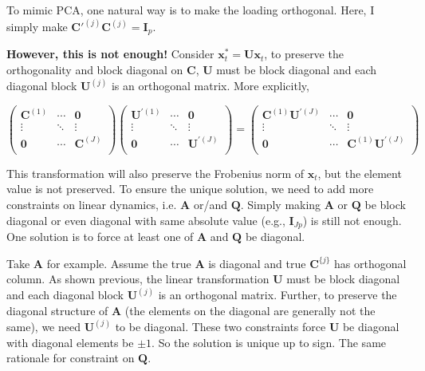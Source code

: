 \documentclass[]{article}
\begin{document}
To mimic PCA, one natural way is to make the loading orthogonal. Here, I simply make \(\mathbf{C}'^{(j)}\mathbf{C}^{(j)} = \mathbf{I}_{p}\).

\textbf{However, this is not enough!} Consider \(\mathbf{x}_{t}^{*} = \mathbf{Ux}_{t}\), to
preserve the orthogonality and block diagonal on \(\mathbf{C}\), \(\mathbf{U}\) must be
block diagonal and each diagonal block \(\mathbf{U}^{(j)}\) is an orthogonal matrix. More explicitly,

\[\begin{pmatrix}
	\mathbf{C}^{(1)} & \cdots & \mathbf{0} \\
	\vdots & \ddots & \vdots \\
	\mathbf{0} & \cdots & \mathbf{C}^{(J)} \\
\end{pmatrix}\begin{pmatrix}
	\mathbf{U}^{'(1)} & \cdots & \mathbf{0} \\
	\vdots & \ddots & \vdots \\
	\mathbf{0} & \cdots & \mathbf{U}^{'(J)} \\
\end{pmatrix} = \begin{pmatrix}
	\mathbf{C}^{(1)}\mathbf{U}^{'(J)} & \cdots & \mathbf{0} \\
	\vdots & \ddots & \vdots \\
	\mathbf{0} & \cdots & \mathbf{C}^{(1)}\mathbf{U}^{'(J)} \\
\end{pmatrix}\]

This transformation will also preserve the Frobenius norm of \(\mathbf{x}_{t}\),
but the element value is not preserved. To ensure the unique solution,
we need to add more constraints on linear dynamics, i.e. \(\mathbf{A}\) or/and
\(\mathbf{Q}\). Simply making \(\mathbf{A}\) or \(\mathbf{Q}\) be block diagonal or even diagonal
with same absolute value (e.g., \(\mathbf{I}_{Jp}\)) is still not enough. One solution is to force at least one of \(\mathbf{A}\) and \(\mathbf{Q}\) be diagonal.

Take \(\mathbf{A}\) for example. Assume the true \(\mathbf{A}\) is diagonal and true
\(\mathbf{C}^{\{ j\}}\) has orthogonal column. As shown previous, the linear transformation \(\mathbf{U}\) must be block diagonal and each diagonal block
\(\mathbf{U}^{(j)}\) is an orthogonal matrix. Further, to preserve the diagonal
structure of \(\mathbf{A}\) (the elements on the diagonal are generally not the
same), we need \(\mathbf{U}^{(j)}\) to be diagonal. These two constraints force
\(\mathbf{U}\) be diagonal with diagonal elements be \(\pm 1\). So the solution
is unique up to sign. The same rationale for constraint on \(\mathbf{Q}\).
\end{document}
